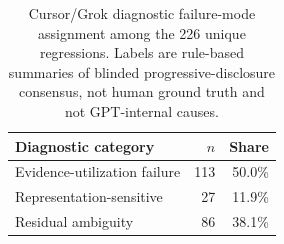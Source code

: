 \begin{table}[t]
\centering
\caption{Cursor/Grok diagnostic failure-mode assignment among the 226 unique regressions. Labels are rule-based summaries of blinded progressive-disclosure consensus, not human ground truth and not GPT-internal causes.}
\label{tab:mechanism-grok}
\begin{tabular}{lrr}
\toprule
Diagnostic category & $n$ & Share \\
\midrule
Evidence-utilization failure & 113 & 50.0\% \\
Representation-sensitive & 27 & 11.9\% \\
Residual ambiguity & 86 & 38.1\% \\
\bottomrule
\end{tabular}
\end{table}
